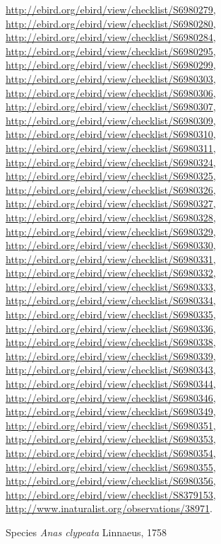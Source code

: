 \documentclass[9pt, article]{memoir}
\begin{document}
\begin{multicols}{2}
\url{http://ebird.org/ebird/view/checklist/S6980279}, 
\url{http://ebird.org/ebird/view/checklist/S6980280}, 
\url{http://ebird.org/ebird/view/checklist/S6980284}, 
\url{http://ebird.org/ebird/view/checklist/S6980295}, 
\url{http://ebird.org/ebird/view/checklist/S6980299}, 
\url{http://ebird.org/ebird/view/checklist/S6980303}, 
\url{http://ebird.org/ebird/view/checklist/S6980306}, 
\url{http://ebird.org/ebird/view/checklist/S6980307}, 
\url{http://ebird.org/ebird/view/checklist/S6980309}, 
\url{http://ebird.org/ebird/view/checklist/S6980310}, 
\url{http://ebird.org/ebird/view/checklist/S6980311}, 
\url{http://ebird.org/ebird/view/checklist/S6980324}, 
\url{http://ebird.org/ebird/view/checklist/S6980325}, 
\url{http://ebird.org/ebird/view/checklist/S6980326}, 
\url{http://ebird.org/ebird/view/checklist/S6980327}, 
\url{http://ebird.org/ebird/view/checklist/S6980328}, 
\url{http://ebird.org/ebird/view/checklist/S6980329}, 
\url{http://ebird.org/ebird/view/checklist/S6980330}, 
\url{http://ebird.org/ebird/view/checklist/S6980331}, 
\url{http://ebird.org/ebird/view/checklist/S6980332}, 
\url{http://ebird.org/ebird/view/checklist/S6980333}, 
\url{http://ebird.org/ebird/view/checklist/S6980334}, 
\url{http://ebird.org/ebird/view/checklist/S6980335}, 
\url{http://ebird.org/ebird/view/checklist/S6980336}, 
\url{http://ebird.org/ebird/view/checklist/S6980338}, 
\url{http://ebird.org/ebird/view/checklist/S6980339}, 
\url{http://ebird.org/ebird/view/checklist/S6980343}, 
\url{http://ebird.org/ebird/view/checklist/S6980344}, 
\url{http://ebird.org/ebird/view/checklist/S6980346}, 
\url{http://ebird.org/ebird/view/checklist/S6980349}, 
\url{http://ebird.org/ebird/view/checklist/S6980351}, 
\url{http://ebird.org/ebird/view/checklist/S6980353}, 
\url{http://ebird.org/ebird/view/checklist/S6980354}, 
\url{http://ebird.org/ebird/view/checklist/S6980355}, 
\url{http://ebird.org/ebird/view/checklist/S6980356}, 
\url{http://ebird.org/ebird/view/checklist/S8379153}, 
\url{http://www.inaturalist.org/observations/38971}.

\vspace{6pt}\noindent\hspace{36pt}Species \textit{Anas clypeata} Linnaeus, 1758



\end{multicols}
\end{document}
